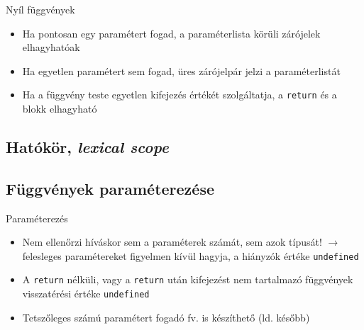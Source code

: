 \documentclass[usenames,dvipsnames,aspectratio=169]{beamer}
\begin{document}
\begin{frame}
    Nyíl függvények
    \begin{itemize}
        \item Ha pontosan egy paramétert fogad, a paraméterlista körüli zárójelek elhagyhatóak
        \item Ha egyetlen paramétert sem fogad, üres zárójelpár jelzi a paraméterlistát
        \item Ha a függvény teste egyetlen kifejezés értékét szolgáltatja, a \texttt{return} és a blokk elhagyható
    \end{itemize}
    \begin{exampleblock}{}
        \small
        
    \end{exampleblock}
\end{frame}

\subsection{Hatókör, \emph{lexical scope}}

\begin{frame}
    \begin{exampleblock}{}
        \scriptsize
        
    \end{exampleblock}
\end{frame}

\subsection{Függvények paraméterezése}

\begin{frame}
    Paraméterezés
    \begin{itemize}
        \item Nem ellenőrzi híváskor sem a paraméterek számát, sem azok típusát! $\to$ felesleges paramétereket figyelmen kívül hagyja, a hiányzók értéke \texttt{undefined}
        \item A \texttt{return} nélküli, vagy a \texttt{return} után kifejezést nem tartalmazó függvények visszatérési értéke \texttt{undefined}
        \item Tetszőleges számú paramétert fogadó fv. is készíthető (ld. később)
    \end{itemize}
    \begin{exampleblock}{}
        \small
        \vspace{-0.3cm}
        
        \vspace{-0.3cm}
    \end{exampleblock}
\end{frame}
\end{document}

